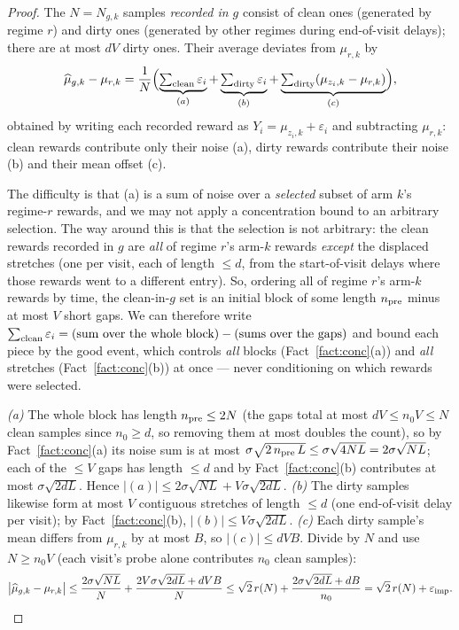 \documentclass[11pt]{article}
\newcommand{\eimp}{\varepsilon_{\mathrm{imp}}}
\begin{document}
\begin{proof}
The $N=N_{g,k}$ samples \emph{recorded in $g$} consist of clean ones (generated by regime $r$) and dirty ones (generated by other regimes during end-of-visit delays); there are at most $dV$ dirty ones. Their average deviates from $\mu_{r,k}$ by
\[
\widehat\mu_{g,k}-\mu_{r,k}
=\frac1N\Bigl(\underbrace{\textstyle\sum_{\rm clean}\varepsilon_i}_{(a)}
+\underbrace{\textstyle\sum_{\rm dirty}\varepsilon_i}_{(b)}
+\underbrace{\textstyle\sum_{\rm dirty}(\mu_{z_i,k}-\mu_{r,k})}_{(c)}\Bigr),
\]
obtained by writing each recorded reward as $Y_i=\mu_{z_i,k}+\varepsilon_i$ and subtracting $\mu_{r,k}$: clean rewards contribute only their noise (a), dirty rewards contribute their noise (b) and their mean offset (c).

The difficulty is that (a) is a sum of noise over a \emph{selected} subset of arm $k$'s regime-$r$ rewards, and we may not apply a concentration bound to an arbitrary selection. The way around this is that the selection is not arbitrary: the clean rewards recorded in $g$ are \emph{all} of regime $r$'s arm-$k$ rewards \emph{except} the displaced stretches (one per visit, each of length $\le d$, from the start-of-visit delays where those rewards went to a different entry). So, ordering all of regime $r$'s arm-$k$ rewards by time, the clean-in-$g$ set is an initial block of some length $n_{\rm pre}$ minus at most $V$ short gaps. We can therefore write $\sum_{\rm clean}\varepsilon_i = (\text{sum over the whole block}) - (\text{sums over the gaps})$ and bound each piece by the good event, which controls \emph{all} blocks (Fact~\ref{fact:conc}(a)) and \emph{all} stretches (Fact~\ref{fact:conc}(b)) at once --- never conditioning on which rewards were selected.

\emph{(a)} The whole block has length $n_{\rm pre}\le 2N$ (the gaps total at most $dV\le n_0V\le N$ clean samples since $n_0\ge d$, so removing them at most doubles the count), so by Fact~\ref{fact:conc}(a) its noise sum is at most $\sigma\sqrt{2\,n_{\rm pre}\,L}\le\sigma\sqrt{4NL}=2\sigma\sqrt{NL}$; each of the $\le V$ gaps has length $\le d$ and by Fact~\ref{fact:conc}(b) contributes at most $\sigma\sqrt{2dL}$. Hence $|(a)|\le 2\sigma\sqrt{NL}+V\sigma\sqrt{2dL}$.
\emph{(b)} The dirty samples likewise form at most $V$ contiguous stretches of length $\le d$ (one end-of-visit delay per visit); by Fact~\ref{fact:conc}(b), $|(b)|\le V\sigma\sqrt{2dL}$.
\emph{(c)} Each dirty sample's mean differs from $\mu_{r,k}$ by at most $B$, so $|(c)|\le dVB$.
Divide by $N$ and use $N\ge n_0V$ (each visit's probe alone contributes $n_0$ clean samples):
\[
\bigl|\widehat\mu_{g,k}-\mu_{r,k}\bigr|
\le\frac{2\sigma\sqrt{NL}}{N}+\frac{2V\sigma\sqrt{2dL}+dVB}{N}
\le\sqrt2\,r(N)+\frac{2\sigma\sqrt{2dL}+dB}{n_0}
=\sqrt2\,r(N)+\eimp . \qedhere
\]
\end{proof}
\end{document}
